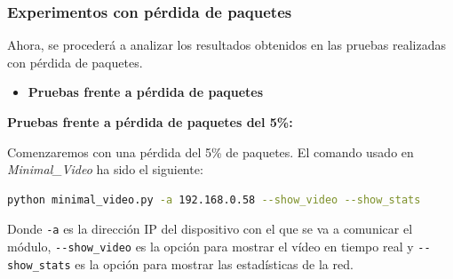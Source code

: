\subsubsection{Experimentos con pérdida de paquetes}

Ahora, se procederá a analizar los resultados obtenidos en las pruebas realizadas con pérdida de paquetes. 
\vspace{\baselineskip}
\begin{itemize}
  \item \textbf{Pruebas frente a pérdida de paquetes}
\end{itemize}

\textbf{Pruebas frente a pérdida de paquetes del 5\%:}
\vspace{\baselineskip}

Comenzaremos con una pérdida del 5\% de paquetes. El comando usado en \textit{Minimal\_Video} ha sido el siguiente:

\begin{lstlisting}[language=bash]
python minimal_video.py -a 192.168.0.58 --show_video --show_stats
\end{lstlisting}
Donde \verb|-a| es la dirección IP del dispositivo con el que se va a comunicar el módulo, \verb|--show_video| es la opción para mostrar el vídeo en tiempo real y \verb|--show_stats| es la opción para mostrar las estadísticas de la red.
\vspace{\baselineskip}

